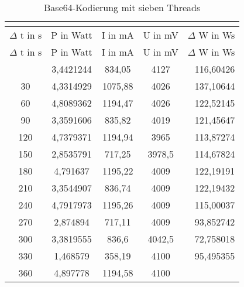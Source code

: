 
\begin{longtable}[c]{ccccc}
\caption{Base64-Kodierung mit sieben Threads} \\
\label{tab:Base64MessungThreadSieben}\\
\hline
{$\Delta$ t in s} & {P in Watt} & {I in mA} & {U in mV} & {$\Delta$ W in Ws} \\
\hline
\endfirsthead
\hline
$\Delta$ t in s & P in Watt & I in mA & U in mV & $\Delta$ W in Ws \\
\hline
\endhead
\hline
\endfoot
\hline
    \midrule
    0     & 3,4421244 & 834,05 & 4127  & \multicolumn{1}{r}{116,60426} \\
    \midrule
    30    & 4,3314929 & 1075,88 & 4026  & \multicolumn{1}{r}{137,10644} \\
    \midrule
    60    & 4,8089362 & 1194,47 & 4026  & \multicolumn{1}{r}{122,52145} \\
    \midrule
    90    & 3,3591606 & 835,82 & 4019  & \multicolumn{1}{r}{121,45647} \\
    \midrule
    120   & 4,7379371 & 1194,94 & 3965  & \multicolumn{1}{r}{113,87274} \\
    \midrule
    150   & 2,8535791 & 717,25 & 3978,5 & \multicolumn{1}{r}{114,67824} \\
    \midrule
    180   & 4,791637 & 1195,22 & 4009  & \multicolumn{1}{r}{122,19191} \\
    \midrule
    210   & 3,3544907 & 836,74 & 4009  & \multicolumn{1}{r}{122,19432} \\
    \midrule
    240   & 4,7917973 & 1195,26 & 4009  & \multicolumn{1}{r}{115,00037} \\
    \midrule
    270   & 2,874894 & 717,11 & 4009  & \multicolumn{1}{r}{93,852742} \\
    \midrule
    300   & 3,3819555 & 836,6 & 4042,5 & \multicolumn{1}{r}{72,758018} \\
    \midrule
    330   & 1,468579 & 358,19 & 4100  & \multicolumn{1}{r}{95,495355} \\
    \midrule
    360   & 4,897778 & 1194,58 & 4100  &  \\
\end{longtable}
